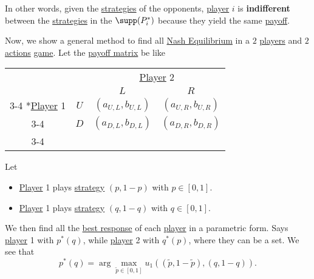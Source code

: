 \begin{intuition}
	In other words, given the \hyperref[def:strategy]{strategies} of the opponents, \hyperref[def:player]{player} \(i\) is \textbf{indifferent} between the \hyperref[def:strategy]{strategies} in the \(\supp(P_{i}^{\ast}) \) because they yield the same \hyperref[def:reward]{payoff}.
\end{intuition}

Now, we show a general method to find all \hyperref[def:Nash-equilibrium]{Nash Equilibrium} in a \(2\) \hyperref[def:player]{players} and \(2\) \hyperref[def:strategy]{actions} \hyperref[def:game]{game}. Let the \hyperref[def:payoff-matrix]{payoff matrix} be like
\begin{table}[H]
	\centering
	\setlength{\extrarowheight}{2pt}
	\begin{tabular}{cc|c|c|}
		                                               & \multicolumn{1}{c}{} & \multicolumn{2}{c}{\hyperref[def:player]{Player} 2}                           \\
		                                               & \multicolumn{1}{c}{} & \multicolumn{1}{c}{$L$}                             & \multicolumn{1}{c}{$R$} \\\cline{3-4}
		\multirow{2}*{\hyperref[def:player]{Player} 1} & $U$                  & $(a_{U, L}, b_{U, L})$                              & $(a_{U, R}, b_{U, R})$  \\\cline{3-4}
		                                               & $D$                  & $(a_{D, L}, b_{D, L})$                              & $(a_{D, R}, b_{D, R})$  \\\cline{3-4}
	\end{tabular}
\end{table}
Let
\begin{itemize}
	\item \hyperref[def:player]{Player} 1 plays \hyperref[def:strategy]{strategy} \((p, 1 - p)\) with \(p\in \left[0, 1\right]\).
	\item \hyperref[def:player]{Player} 1 plays \hyperref[def:strategy]{strategy} \((q, 1 - q)\) with \(q\in \left[0, 1\right]\).
\end{itemize}
We then find all the \hyperref[def:best-response]{best response} of each \hyperref[def:player]{player} in a parametric form. Says \hyperref[def:player]{player} 1 with \(p^{\ast}(q)\), while \hyperref[def:player]{player} 2 with \(q^{\ast}(p)\), where they can be a set. We see that
\[
	p^{\ast}(q) = \arg\max_{\widetilde{p}\in\left[0, 1\right]}u_1\left((\widetilde{p}, 1 - \widetilde{p}), (q, 1 - q)\right).
\]
